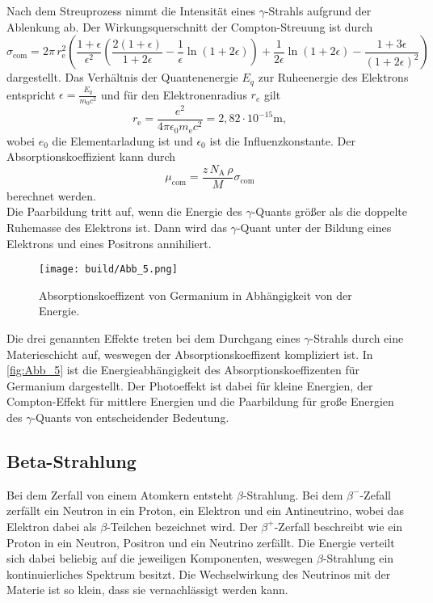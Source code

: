 Nach dem Streuprozess nimmt die Intensität eines $\gamma$-Strahls aufgrund der Ablenkung ab. 
Der Wirkungsquerschnitt der Compton-Streuung ist durch
\begin{equation}
    \sigma_\mathrm{com}=2\pi\,r_\mathrm{e}^2\left(\frac{1+\epsilon}{\epsilon^2}\left(\frac{2(1+\epsilon)}{1+2\epsilon}-\frac{1}{\epsilon}\ln(1+2\epsilon) \right)+\frac{1}{2\epsilon}\ln(1+2\epsilon)-\frac{1+3\epsilon}{(1+2\epsilon)^2}\right)
    \label{eqn:sigmacom}
\end{equation}
dargestellt. Das Verhältnis der Quantenenergie $E_q$ zur Ruheenergie des Elektrons entspricht $\epsilon = \frac{E_q}{m_0c^2}$ 
und für den Elektronenradius $r_e$ gilt
\begin{equation*}
    r_\mathrm{e}=\frac{e^2}{4\pi\epsilon_0 m_\mathrm{e}c^2}=2,82\cdot10^{-15}\si{\meter},
\end{equation*}
wobei $e_0$ die Elementarladung ist und $\epsilon_0$ ist die Influenzkonstante.
Der Absorptionskoeffizient kann durch
\begin{equation}
    \mu_\mathrm{com}=\frac{z\,N_\mathrm{A}\,\rho}{M}\sigma_\mathrm{com}
    \label{eqn:Absorptionskoeffizient}
\end{equation}
berechnet werden.\\
Die Paarbildung tritt auf, wenn die Energie des $\gamma$-Quants größer als die doppelte Ruhemasse des Elektrons ist.
Dann wird das $\gamma$-Quant unter der Bildung eines Elektrons und eines Positrons annihiliert.\\
\begin{figure}[H]
    \centering
    \texttt{[image: build/Abb\_5.png]}
    \caption {Absorptionskoeffizent von Germanium in Abhängigkeit von der Energie\cite[236]{V704}.}
    \label{fig:Abb_5}
\end{figure}
Die drei genannten Effekte treten bei dem Durchgang eines $\gamma$-Strahls durch eine Materieschicht auf, weswegen der Absorptionskoeffizent kompliziert ist.
In \autoref{fig:Abb_5} ist die Energieabhängigkeit des Absorptionskoeffizenten für Germanium dargestellt.
Der Photoeffekt ist dabei für kleine Energien, der Compton-Effekt für mittlere Energien und die Paarbildung für große Energien des $\gamma$-Quants
von entscheidender Bedeutung.

\subsection{Beta-Strahlung} %
\label{sub:Beta-Strahlung}
Bei dem Zerfall von einem Atomkern entsteht $\beta$-Strahlung. Bei dem $\beta^-$-Zefall zerfällt ein Neutron in ein Proton, 
ein Elektron und ein Antineutrino, wobei das Elektron dabei als $\beta$-Teilchen bezeichnet wird.
Der $\beta^+$-Zerfall beschreibt wie ein Proton in ein Neutron, Positron und ein Neutrino zerfällt.
Die Energie verteilt sich dabei beliebig auf die jeweiligen Komponenten, weswegen $\beta$-Strahlung ein kontinuierliches Spektrum besitzt.
Die Wechselwirkung des Neutrinos mit der Materie ist so klein, dass sie vernachlässigt werden kann.

